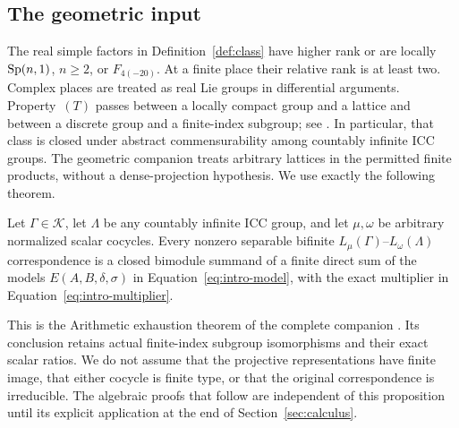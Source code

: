 \subsection{The geometric input}
The real simple factors in Definition~\ref{def:class} have higher rank
or are locally $\operatorname{Sp}(n,1)$, $n\geq2$, or $F_{4(-20)}$. At a finite
place their relative rank is at least two. Complex places are treated as
real Lie groups in differential arguments.
Property~$(T)$ passes between a locally compact group and a lattice and
between a discrete group and a finite-index subgroup; see \cite{BHV2008}. In particular,
that class is closed under abstract commensurability among countably
infinite ICC groups. The geometric companion treats arbitrary lattices
in the permitted finite products, without a dense-projection hypothesis.
We use exactly the following theorem.

\begin{proposition}
\label{prop:recovery-exhaustion}
Let $\Gamma\in\mathscr K$, let $\Lambda$ be any countably infinite ICC
group, and let $\mu,\omega$ be arbitrary normalized scalar cocycles.
Every nonzero separable bifinite
$L_\mu(\Gamma)$--$L_\omega(\Lambda)$ correspondence is a closed bimodule
summand of a finite direct sum of the models
$E(A,B,\delta,\sigma)$ in Equation~\eqref{eq:intro-model}, with the
exact multiplier in Equation~\eqref{eq:intro-multiplier}.
\end{proposition}

This is the Arithmetic exhaustion theorem of the complete companion
\cite[Theorem~1.2]{ArithmeticCompanion}. Its conclusion
retains actual finite-index subgroup isomorphisms and their exact scalar
ratios. We do not assume that the projective representations have finite
image, that either cocycle is finite type, or that the original
correspondence is irreducible. The algebraic proofs that follow are
independent of this proposition until its explicit application at the end
of Section~\ref{sec:calculus}.
